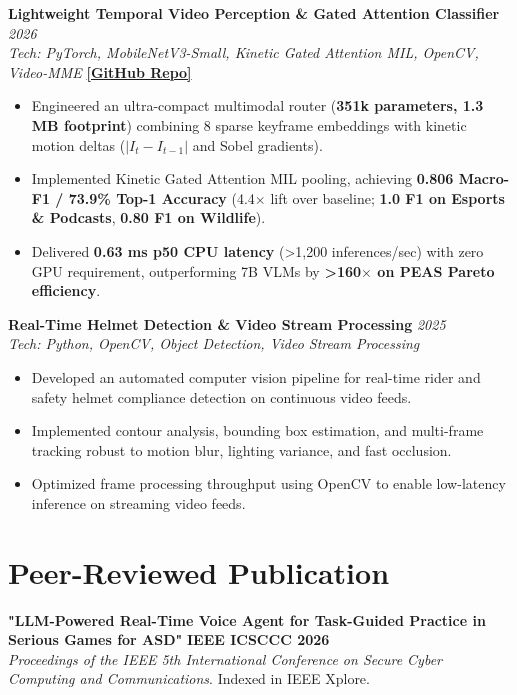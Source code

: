 \documentclass[10pt,a4paper]{article}
\begin{document}
\vspace{2.5pt}
\noindent\textbf{Lightweight Temporal Video Perception \& Gated Attention Classifier} \hfill \textit{2026} \\
\small\textit{Tech: PyTorch, MobileNetV3-Small, Kinetic Gated Attention MIL, OpenCV, Video-MME} \hfill \href{https://github.com/harsh2b/vision-classifier}{\textbf{[GitHub Repo]}}
\begin{itemize}
    \item Engineered an ultra-compact multimodal router (\textbf{351k parameters, 1.3 MB footprint}) combining 8 sparse keyframe embeddings with kinetic motion deltas ($|I_t - I_{t-1}|$ and Sobel gradients).
    \item Implemented Kinetic Gated Attention MIL pooling, achieving \textbf{0.806 Macro-F1 / 73.9\% Top-1 Accuracy} (4.4$\times$ lift over baseline; \textbf{1.0 F1 on Esports \& Podcasts}, \textbf{0.80 F1 on Wildlife}).
    \item Delivered \textbf{0.63 ms p50 CPU latency} (>1,200 inferences/sec) with zero GPU requirement, outperforming 7B VLMs by \textbf{>160$\times$ on PEAS Pareto efficiency}.
\end{itemize}

\vspace{2.5pt}
\noindent\textbf{Real-Time Helmet Detection \& Video Stream Processing} \hfill \textit{2025} \\
\small\textit{Tech: Python, OpenCV, Object Detection, Video Stream Processing}
\begin{itemize}
    \item Developed an automated computer vision pipeline for real-time rider and safety helmet compliance detection on continuous video feeds.
    \item Implemented contour analysis, bounding box estimation, and multi-frame tracking robust to motion blur, lighting variance, and fast occlusion.
    \item Optimized frame processing throughput using OpenCV to enable low-latency inference on streaming video feeds.
\end{itemize}

\section*{Peer-Reviewed Publication}
\noindent\small
\textbf{"LLM-Powered Real-Time Voice Agent for Task-Guided Practice in Serious Games for ASD"} \hfill \textbf{IEEE ICSCCC 2026} \\
\textit{Proceedings of the IEEE 5th International Conference on Secure Cyber Computing and Communications}. Indexed in IEEE Xplore.
\end{document}
